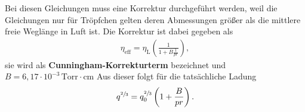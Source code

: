 Bei diesen Gleichungen muss eine Korrektur durchgeführt werden, weil die Gleichungen nur für Tröpfchen gelten deren Abmessungen größer als die mittlere freie Weglänge in Luft ist.
Die Korrektur ist dabei gegeben als
\begin{align}
\label{eq:Theorie_Cunningham_Viskositaet}
\eta_\text{eff}=\eta_\text{L}\left( \frac{1}{1+B\frac{1}{pr}} \right),
\end{align}
sie wird als \textbf{Cunningham-Korrekturterm} bezeichnet und $B=6,17\cdot10^{-3}\, \text{Torr}\cdot \text{cm}$
Aus dieser folgt für die tatsächliche Ladung
\begin{equation}
\label{eq:Theorie_Cunningham_Ladung}
q^{\sfrac{2}{3}}= q_{0}^{\sfrac{2}{3}} \del{1+\dfrac{B}{pr}}.
\end{equation}